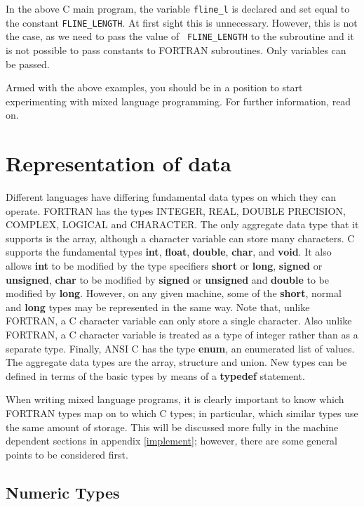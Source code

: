 In the above C main program, the variable {\tt fline\_l} is declared and set
equal to the constant {\tt FLINE\_LENGTH}. At first sight this is unnecessary.
However, this is not the case, as we need to pass the value of {\tt
FLINE\_LENGTH} to the subroutine and it is not possible to pass constants to
FORTRAN subroutines. Only variables can be passed.

Armed with the above examples, you should be in a position to start
experimenting with mixed language programming. For further information, read
on.

\section{Representation of data}

Different languages have differing fundamental data types on which they can
operate. FORTRAN has the types INTEGER, REAL, DOUBLE PRECISION, COMPLEX,
LOGICAL and CHARACTER. The only aggregate data type that it supports is the
array, although a character variable can store many characters. C supports the
fundamental types {\bf int}, {\bf float}, {\bf double}, {\bf char}, and {\bf
void}. It also allows {\bf int} to be modified by the type specifiers {\bf
short} or {\bf long}, {\bf signed} or {\bf unsigned}, {\bf char} to be modified
by {\bf signed} or {\bf unsigned} and {\bf double} to be modified by {\bf
long}. However, on any given machine, some of the {\bf short}, normal and {\bf
long} types may be represented in the same way. Note that, unlike FORTRAN, a C
character variable can only store a single character. Also unlike FORTRAN, a C
character variable is treated as a type of integer rather than as a separate
type. Finally, ANSI C has the type {\bf enum}, an enumerated list of values.
The aggregate data types are the array, structure and union. New types can be
defined in terms of the basic types by means of a {\bf typedef} statement.

When writing mixed language programs, it is clearly important to know which
FORTRAN types map on to which C types; in particular, which similar types use
the same amount of storage. This will be discussed more fully in the machine
dependent sections in appendix \ref{implement}; however, there are some general
points to be considered first.

\subsection{Numeric Types}

